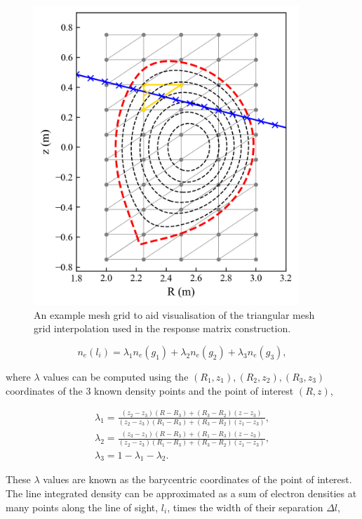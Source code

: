 \begin{figure}
  \centering
  \includegraphics[width=10cm]{images/meshtriangle.png}
  \caption{An example mesh grid to aid visualisation of the triangular mesh grid interpolation used in the response matrix construction.}
  \label{fig:meshtriangle}
\end{figure}

\begin{equation}
  n_e(l_i) = \lambda_1 n_e(g_1) + \lambda_2 n_e(g_2) + \lambda_3 n_e(g_3),
\end{equation}

\noindent where $\lambda$ values can be computed using the $(R_1,z_1), (R_2,z_2), (R_3,z_3)$ coordinates of the 3 known density points and the point of interest $(R, z)$,

\begin{gather}
\lambda_1 = \frac{(z_2 - z_3)(R - R_3) + (R_3 - R_2)(z - z_3)}{(z_2 - z_3)(R_1 - R_3) + (R_3 - R_2)(z_1 - z_3)},\\
\lambda_2 = \frac{(z_3 - z_1)(R - R_3) + (R_1 - R_3)(z - z_3)}{(z_2 - z_3)(R_1 - R_3) + (R_3 - R_2)(z_1 - z_3)},\\
\lambda_3 = 1-\lambda_1-\lambda_2.
\end{gather}

\noindent These $\lambda$ values are known as the barycentric coordinates of the point of interest. The line integrated density can be approximated as a sum of electron densities at many points along the line of sight, $l_i$, times the width of their separation $\Delta l$,

